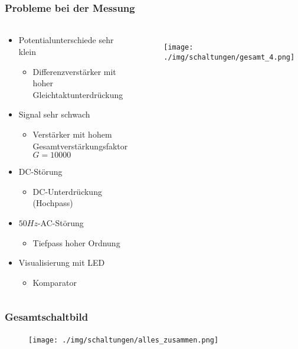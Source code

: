 \begin{frame}
    \frametitle{Probleme bei der Messung}
    \framesubtitle{}
    \begin{columns}[c]
    \begin{block}{}
        \begin{itemize}
            \item Potentialunterschiede sehr klein
            \begin{itemize}
                \item Differenzverstärker mit hoher
                Gleichtaktunterdrückung
            \end{itemize}
            \item Signal sehr schwach
                \begin{itemize}
                    \item Verstärker mit hohem Gesamtverstärkungsfaktor $G=10000$
                \end{itemize}
            \item DC-Störung
                \begin{itemize}
                    \item DC-Unterdrückung (Hochpass)
                \end{itemize}
            \item $50Hz$-AC-Störung
                \begin{itemize}
                    \item Tiefpass hoher Ordnung
                \end{itemize}
            \item Visualisierung mit LED
            \pause
                \begin{itemize}
                    \item Komparator
                \end{itemize}        
        \end{itemize}
    \end{block}
    \begin{figure}[H]
    \begin{center}
            \texttt{[image: ./img/schaltungen/gesamt\_4.png]}
    \end{center}
    \end{figure}
    \end{columns}
\end{frame}

\begin{frame}
    \frametitle{Gesamtschaltbild}
    \framesubtitle{}
    \begin{figure}[H]
    \begin{center}
            \texttt{[image: ./img/schaltungen/alles\_zusammen.png]}
    \end{center}
    \end{figure}
\end{frame}
